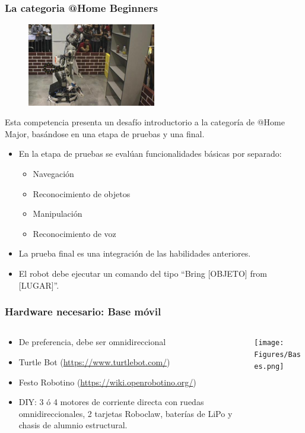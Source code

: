 \documentclass[10pt,spanish,aspectratio=1610]{beamer}
\begin{document}
\begin{frame}\frametitle{La categoria @Home Beginners}
  \begin{figure}
    \centering
    \includegraphics[width=0.5\textwidth]{Figures/AtHomeBeginners.jpg}
  \end{figure}

  Esta competencia presenta un desafío introductorio a la categoría de @Home Major, basándose en una etapa de pruebas y una final.
      \begin{itemize}
      \item En la etapa de pruebas se evalúan funcionalidades básicas por separado:
        \begin{itemize}
        \item Navegación
        \item Reconocimiento de objetos
        \item Manipulación
        \item Reconocimiento de voz
        \end{itemize}
      \item La prueba final es una integración de las habilidades anteriores.
      \item El robot debe ejecutar un comando del tipo ``Bring [OBJETO] from [LUGAR]''.
      \end{itemize}
\end{frame}

\begin{frame}\frametitle{Hardware necesario: Base móvil}
  \begin{columns}
    \begin{column}{0.5\textwidth}
      \begin{itemize}
      \item De preferencia, debe ser omnidireccional
      \item Turtle Bot (\url{https://www.turtlebot.com/})
      \item Festo Robotino (\url{https://wiki.openrobotino.org/})
      \item DIY: 3 ó 4 motores de corriente directa con ruedas omnidireccionales, 2 tarjetas Roboclaw, baterías de LiPo y chasis de alumnio estructural.
      \end{itemize}
    \end{column}
    \begin{column}{0.5\textwidth}
      \texttt{[image: Figures/Bases.png]}
    \end{column}
  \end{columns}
\end{frame}
\end{document}
